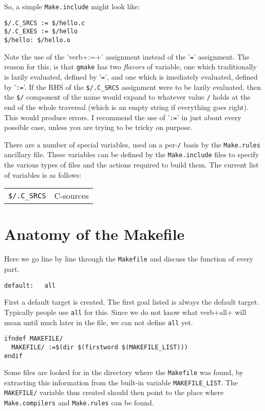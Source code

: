 \documentclass{article}
\begin{document}
So, a simple \verb+Make.include+ might look like:
\begin{verbatim}
$/.C_SRCS := $/hello.c
$/.C_EXES := $/hello
$/hello: $/hello.o
\end{verbatim}

Note the use of the 'verb+:=+' assignment instead of the '\verb+=+'
assignment.  The reason for this, is that \verb+gmake+ has two {\em flavors}
of variable, one which traditionally is lazily evaluated, defined by
'\verb+=+', and one which is imediately evaluated, defined by '\verb+:=+'.
If the RHS of the \verb+$/.C_SRCS+ assignment were to be lazily
evaluated, then the \verb+$/+ component of the name would expand to
whatever value \verb+/+ holds at the end of the whole traversal
(which is an empty string if everything goes right).  This would
produce errors.  I recommend the use of '\verb+:=+' in just about
every possible case, unless you are trying to be tricky on purpose.

There are a number of special variables, used on a per-\verb+/+
basis by the \verb+Make.rules+ ancillary file.  These variables can
be defined by the \verb+Make.include+ files to specify the various
types of files and the actions required to build them.  The current
list of variables is as follows:

\begin{tabular}{lc}
\verb+$/.C_SRCS+ & C-sources
\end{tabular}



\section{Anatomy of the Makefile}

Here we go line by line through the \verb+Makefile+ and discuss the function
of every part.

\begin{verbatim}
default:   all
\end{verbatim}
First a default target is created.  The first goal listed is always
the default target.  Typically people use \verb+all+ for this.  Since
we do not know what verb+all+ will mean until much later in the file,
we can not define \verb+all+ yet.

\begin{verbatim}
ifndef MAKEFILE/
  MAKEFILE/ :=$(dir $(firstword $(MAKEFILE_LIST)))
endif
\end{verbatim}
Some files are looked for in the directory where the
\verb+Makefile+ was found, by extracting this information from the
built-in variable \verb+MAKEFILE_LIST+.  The \verb+MAKEFILE/+ variable
thus created should then point to the place where \verb+Make.compilers+
and \verb+Make.rules+ can be found.
\end{document}
